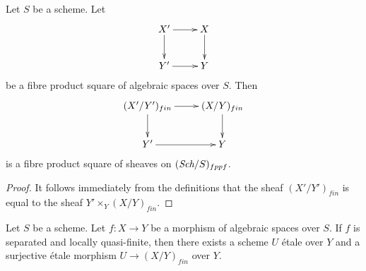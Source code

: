 \begin{lemma}
\label{lemma-finite-pullback}
Let $S$ be a scheme.
Let
$$
\xymatrix{
X' \ar[d] \ar[r] & X \ar[d] \\
Y' \ar[r] & Y
}
$$
be a fibre product square of algebraic spaces over $S$. Then
$$
\xymatrix{
(X'/Y')_{fin} \ar[d] \ar[r] & (X/Y)_{fin} \ar[d] \\
Y' \ar[r] & Y
}
$$
is a fibre product square of sheaves on $(\textit{Sch}/S)_{fppf}$.
\end{lemma}

\begin{proof}
It follows immediately from the definitions that
the sheaf $(X'/Y')_{fin}$ is equal to the sheaf
$Y' \times_Y (X/Y)_{fin}$.
\end{proof}

\begin{lemma}
\label{lemma-finite-surjective-etale-cover}
Let $S$ be a scheme.
Let $f : X \to Y$ be a morphism of algebraic spaces over $S$.
If $f$ is separated and locally quasi-finite, then there exists a
scheme $U$ \'etale over $Y$ and a surjective \'etale morphism
$U \to (X/Y)_{fin}$ over $Y$.
\end{lemma}

